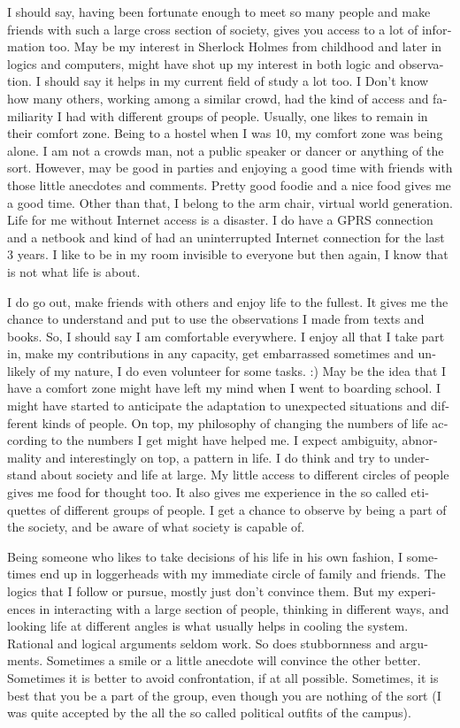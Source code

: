 \begin{english}
I should say, having been fortunate enough to meet so many people and make friends with such a 
large cross section of society, gives you access to a lot of information too. May be my interest
in Sherlock Holmes from childhood and later in logics and computers, might have shot up my interest 
in both logic and observation. I should say it helps in my current field of study a lot too. I Don't 
know how many others, working among a similar crowd, had the kind of access and familiarity I had with
different groups of people. Usually, one likes to remain in their comfort zone. Being to a hostel 
when I was 10, my comfort zone was being alone. I am not a crowds man, not a public speaker or dancer 
or anything of the sort. However, may be good in parties and enjoying a good time with friends with those little anecdotes
and comments. Pretty good foodie and a nice food gives me a good time. Other than that, I belong to 
the arm chair, virtual world generation. Life for me without Internet access is a disaster. I do have
a GPRS connection and a netbook and kind of had an uninterrupted Internet connection for the last 3 years. I like to 
be in my room invisible to everyone but then again, I know that is not what life is about. 

I do go out, make friends with others and enjoy life to the fullest. It gives me the chance to understand 
and put to use the observations I made from texts and books. So, I should say I am comfortable
everywhere. I enjoy all that I take part in, make my contributions in any capacity, get embarrassed
sometimes and unlikely of my nature, I do even volunteer for some tasks. :) May be the idea that I
have a comfort zone might have left my mind when I went to boarding school. I might have started to anticipate the adaptation to 
unexpected situations and different kinds of people. On top, 
my philosophy of changing the numbers of life according to the numbers I get might have helped me. I 
expect ambiguity, abnormality and interestingly on top, a pattern in life. I do think and try to
understand about society and life at large. My little access to different circles of people gives 
me food for thought too. It also gives me experience in the so called etiquettes of different 
groups of people. I get a chance to observe by being a part of the society, and be aware of what society 
is capable of. 

Being someone who likes to take decisions of his life in his own fashion, I sometimes end up in
loggerheads with my immediate circle of family and friends. The logics that I follow or pursue, mostly 
just don't convince them. But my experiences in interacting with a large section of people, thinking 
in different ways, and looking life at different angles is what usually helps in cooling the system.
Rational and logical arguments seldom work. So does stubbornness and arguments. Sometimes a smile or 
a little anecdote will convince the other better. Sometimes it is better to avoid confrontation, if at 
all possible. Sometimes, it is best that you be a part of the group, even though you are nothing of the 
sort (I was quite accepted by the all the so called political outfits of the campus). 


\end{english}

